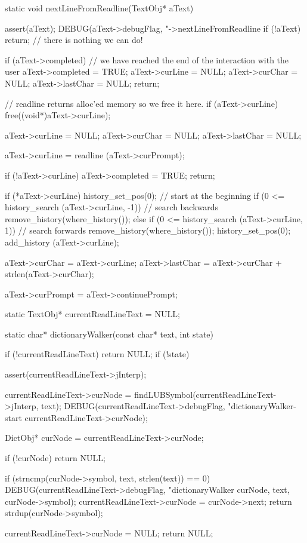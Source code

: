 \startCCode
static void nextLineFromReadline(TextObj* aText) {
  assert(aText);
  DEBUG(aText->debugFlag, "->nextLineFromReadline %
  if (!aText) return; // there is nothing we can do!

  if (aText->completed) {
    // we have reached the end of the interaction with the user
    aText->completed = TRUE;
    aText->curLine   = NULL;
    aText->curChar   = NULL;
    aText->lastChar  = NULL;
    return;
  }

  // readline returns alloc'ed memory so we free it here.
  if (aText->curLine) free((void*)aText->curLine);

  aText->curLine  = NULL;
  aText->curChar  = NULL;
  aText->lastChar = NULL;

  aText->curLine = readline (aText->curPrompt);

  if (!aText->curLine) {
    aText->completed = TRUE;
    return;
  }

  if (*aText->curLine) {
    history_set_pos(0); // start at the beginning
    if (0 <= history_search (aText->curLine, -1)) { // search backwards
      remove_history(where_history());
    } else if (0 <= history_search (aText->curLine, 1)) { // search forwards
      remove_history(where_history());
    }
    history_set_pos(0);
    add_history (aText->curLine);
  }

  aText->curChar  = aText->curLine;
  aText->lastChar = aText->curChar + strlen(aText->curChar);

  aText->curPrompt = aText->continuePrompt;
}
\stopCCode

\startCCode
static TextObj* currentReadLineText = NULL;
\stopCCode

\startCCode
static char* dictionaryWalker(const char* text, int state) {
  if (!currentReadLineText) return NULL;
  if (!state) {

    assert(currentReadLineText->jInterp);

    currentReadLineText->curNode =
      findLUBSymbol(currentReadLineText->jInterp, text);
    DEBUG(currentReadLineText->debugFlag,
          "dictionaryWalker-start %
          currentReadLineText->curNode);
  }
  DictObj* curNode = currentReadLineText->curNode;

  if (!curNode) return NULL;

  if (strncmp(curNode->symbol, text, strlen(text)) == 0) {
    DEBUG(currentReadLineText->debugFlag,
          "dictionaryWalker %
          curNode, text, curNode->symbol);
    currentReadLineText->curNode = curNode->next;
    return strdup(curNode->symbol);
  }

  currentReadLineText->curNode = NULL;
  return NULL;
}

